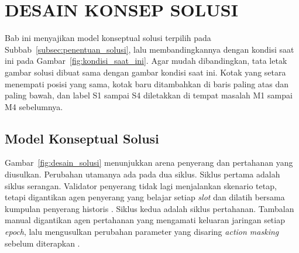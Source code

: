 \cleardoublepage %
\chapter{DESAIN KONSEP SOLUSI}
\label{chap:desain-konsep-solusi}

Bab ini menyajikan model konseptual solusi terpilih pada Subbab~\ref{subsec:penentuan_solusi}, lalu membandingkannya dengan kondisi saat ini pada Gambar~\ref{fig:kondisi_saat_ini}. Agar mudah dibandingkan, tata letak gambar solusi dibuat sama dengan gambar kondisi saat ini. Kotak yang setara menempati posisi yang sama, kotak baru ditambahkan di baris paling atas dan paling bawah, dan label S1 sampai S4 diletakkan di tempat masalah M1 sampai M4 sebelumnya.

\section{Model Konseptual Solusi}
\label{sec:model_solusi}
Gambar~\ref{fig:desain_solusi} menunjukkan arena penyerang dan pertahanan yang diusulkan. Perubahan utamanya ada pada dua siklus. Siklus pertama adalah siklus serangan. Validator penyerang tidak lagi menjalankan skenario tetap, tetapi digantikan agen penyerang yang belajar setiap \textit{slot} dan dilatih bersama kumpulan penyerang historis \parencite{wushishi2026coadam}. Siklus kedua adalah siklus pertahanan. Tambalan manual digantikan agen pertahanan yang mengamati keluaran jaringan setiap \textit{epoch}, lalu mengusulkan perubahan parameter yang disaring \textit{action masking} sebelum diterapkan \parencite{skowronski2026adaptive}.

